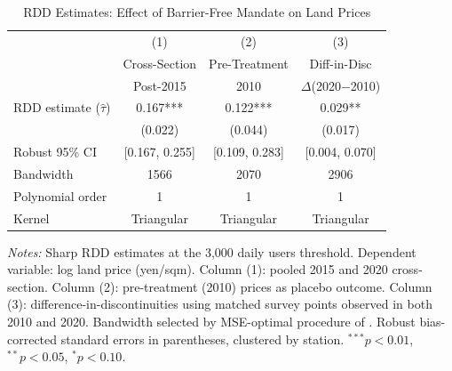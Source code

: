 \begin{table}[t]
\centering
\caption{RDD Estimates: Effect of Barrier-Free Mandate on Land Prices}
\label{tab:main_rdd}
\begin{tabular}{lccc}
\hline\hline
 & (1) & (2) & (3) \\
 & Cross-Section & Pre-Treatment & Diff-in-Disc \\
 & Post-2015 & 2010 & $\Delta$(2020$-$2010) \\
\hline
RDD estimate ($\hat{\tau}$) & 0.167*** & 0.122*** & 0.029** \\
 & (0.022) & (0.044) & (0.017) \\
Robust 95\% CI & [0.167, 0.255] & [0.109, 0.283] & [0.004, 0.070] \\
Bandwidth & 1566 & 2070 & 2906 \\
Polynomial order & 1 & 1 & 1 \\
Kernel & Triangular & Triangular & Triangular \\
\hline\hline
\end{tabular}
\begin{tablenotes}
\item \textit{Notes:} Sharp RDD estimates at the 3,000 daily users threshold. Dependent variable: log land price (yen/sqm). Column (1): pooled 2015 and 2020 cross-section. Column (2): pre-treatment (2010) prices as placebo outcome. Column (3): difference-in-discontinuities using matched survey points observed in both 2010 and 2020. Bandwidth selected by MSE-optimal procedure of \citet{cattaneo2020}. Robust bias-corrected standard errors in parentheses, clustered by station. $^{***}p<0.01$, $^{**}p<0.05$, $^{*}p<0.10$.
\end{tablenotes}
\end{table}

